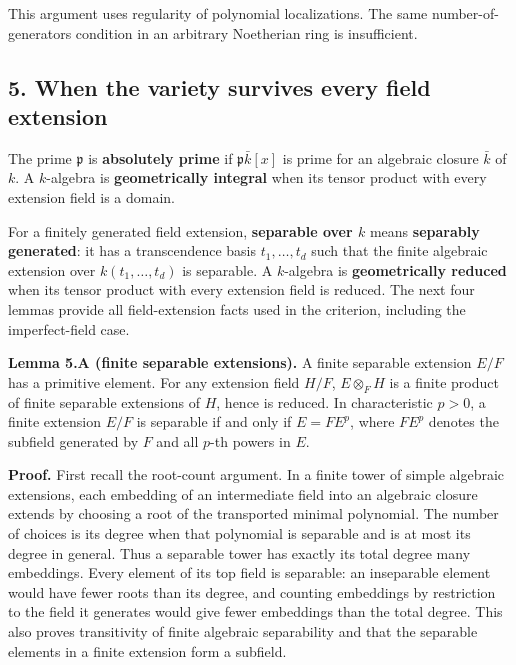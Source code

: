 \documentclass[
]{article}
\begin{document}
This argument uses regularity of polynomial localizations. The same
number-of-generators condition in an arbitrary Noetherian ring is
insufficient.

\subsection{5. When the variety survives every field
extension}\label{when-the-variety-survives-every-field-extension}

The prime \(\mathfrak p\) is \textbf{absolutely prime} if
\(\mathfrak p\bar k[x]\) is prime for an algebraic closure \(\bar k\) of
\(k\). A \(k\)-algebra is \textbf{geometrically integral} when its
tensor product with every extension field is a domain.

For a finitely generated field extension, \textbf{separable over \(k\)}
means \textbf{separably generated}: it has a transcendence basis
\(t_1,\ldots,t_d\) such that the finite algebraic extension over
\(k(t_1,\ldots,t_d)\) is separable. A \(k\)-algebra is
\textbf{geometrically reduced} when its tensor product with every
extension field is reduced. The next four lemmas provide all
field-extension facts used in the criterion, including the
imperfect-field case.

\textbf{Lemma 5.A (finite separable extensions).} A finite separable
extension \(E/F\) has a primitive element. For any extension field
\(H/F\), \(E\otimes_F H\) is a finite product of finite separable
extensions of \(H\), hence is reduced. In characteristic \(p>0\), a
finite extension \(E/F\) is separable if and only if \(E=FE^p\), where
\(FE^p\) denotes the subfield generated by \(F\) and all \(p\)-th powers
in \(E\).

\textbf{Proof.} First recall the root-count argument. In a finite tower
of simple algebraic extensions, each embedding of an intermediate field
into an algebraic closure extends by choosing a root of the transported
minimal polynomial. The number of choices is its degree when that
polynomial is separable and is at most its degree in general. Thus a
separable tower has exactly its total degree many embeddings. Every
element of its top field is separable: an inseparable element would have
fewer roots than its degree, and counting embeddings by restriction to
the field it generates would give fewer embeddings than the total
degree. This also proves transitivity of finite algebraic separability
and that the separable elements in a finite extension form a subfield.
\end{document}
